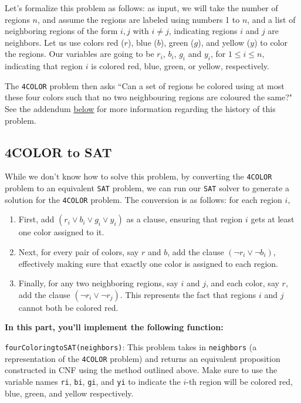 \documentclass{article}
\begin{document}
    \vspace{2mm}
    Let's formalize this problem as follows: as input, we will take the number of regions $n$, and assume the regions are labeled using numbers 1 to $n$, and a list of neighboring regions of the form ${i,j}$ with $i\neq j$, indicating regions $i$ and $j$ are neighbors. Let us use colors red ($r$), blue ($b$), green ($g$), and yellow ($y$) to color the regions. Our variables are going to be $r_i$, $b_i$, $g_i$ and $y_i$, for $1 \leq i \leq n$, indicating that region $i$ is colored red, blue, green, or yellow, respectively.
    
    \vspace{2mm}
    The \lstinline{4COLOR} problem then asks ``Can a set of regions be colored using at most these four colors such that no two neighbouring regions are coloured the same?" See the addendum \hyperlink{fct}{below} for more information regarding the history of this problem. 

\subsection*{4COLOR to SAT}
    While we don't know how to solve this problem, by converting the \lstinline{4COLOR} problem to an equivalent \lstinline{SAT} problem, we can run our \lstinline{SAT} solver to generate a solution for the \lstinline{4COLOR} problem. The conversion is as follows: for each region $i$,
    \begin{enumerate}[label = \arabic*.]
        \item First, add $(r_i \lor b_i \lor g_i \lor y_i)$ as a clause, ensuring that region $i$ gets at least one color assigned to it. 
        \item Next, for every pair of colors, say $r$ and $b$, add the clause $(\neg r_i \lor \neg b_i)$, effectively making sure that exactly one color is assigned to each region.
        \item Finally, for any two neighboring regions, say $i$ and $j$, and each color, say $r$, add the clause $(\neg r_i \lor \neg r_j)$. This represents the fact that regions $i$ and $j$ cannot both be colored red.
    \end{enumerate}

    \textbf{In this part, you'll implement the following function:}
    \begin{tcolorbox}[colback=blue!10]
        \lstinline{fourColoringtoSAT(neighbors)}: This problem takes in \lstinline{neighbors} (a representation of the \lstinline{4COLOR} problem) and returns an equivalent proposition constructed in CNF using the method outlined above. Make sure to use the variable names \verb+ri+, \verb+bi+, \verb+gi+, and \verb+yi+ to indicate the $i$-th region will be colored red, blue, green, and yellow respectively.
    \end{tcolorbox}
\end{document}
